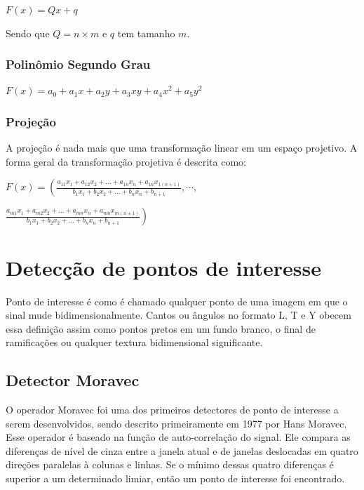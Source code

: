 \documentclass[9pt, a4paper, nofonttune, journal]{IEEEtran}
\begin{document}
\begin{center}
$F(x)=Qx+q$\end{center}
Sendo que $Q=n\times m$ e $q$ tem tamanho $m$. \cite{CGPPBook1}

\subsubsection{Polinômio Segundo Grau}

$F(x)=a_{0}+a_{1}x+a_{2}y+a_{3}xy+a_{4}x^{2}+a_{5}y^{2}$

\subsubsection{Projeção}

A projeção é nada mais que uma transformação linear em um espaço projetivo.\cite{CGPPBook1}
A forma geral da transformação projetiva é descrita como:

$F(x)=\left( \frac{a_{11}x_{1}+a_{12}x_{2}+...+a_{1n}x_{n}+a_{1n}x_{1(n+1)}}{b_{1}x_{1}+b_{2}x_{2}+...+b_{n}x_{n}+b_{n+1}},\cdots,\right.$

\begin{center}
$\left. \frac{a_{m1}x_{1}+a_{m2}x_{2}+...+a_{mn}x_{n}+a_{mn}x_{m(n+1)}}{b_{1}x_{1}+b_{2}x_{2}+...+b_{n}x_{n}+b_{n+1}} \right)$\end{center}

\section{Detecção de pontos de interesse}
Ponto de interesse é como é chamado qualquer ponto de uma imagem em que o sinal mude bidimensionalmente. Cantos ou ângulos
no formato L, T e Y obecem essa definição assim como pontos pretos em um fundo branco, o final de ramificações ou qualquer textura bidimensional
significante.\cite{Coderlia1}

\subsection{Detector Moravec}
O operador Moravec foi uma dos primeiros detectores de ponto de interesse a serem desenvolvidos, sendo descrito primeiramente 
em 1977 por Hans Moravec.\cite{Moravec1}
Esse operador é baseado na função de auto-correlação do signal. Ele compara as diferenças de nível de cinza entre a janela atual e de janelas 
deslocadas em quatro direções paralelas à colunas e linhas. Se o mínimo dessas quatro diferenças é superior a um determinado limiar, então um ponto de interesse
foi encontrado.\cite{Coderlia1}
  
\end{document}
